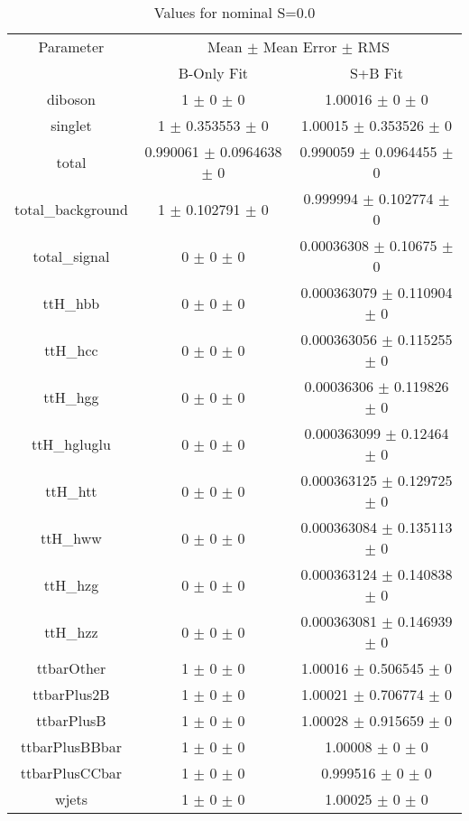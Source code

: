 \begin{table}
\centering
\caption{Values for nominal S=0.0}
\begin{tabular}{ccc}
\toprule
Parameter & \multicolumn{2}{c}{Mean $\pm$ Mean Error $\pm$ RMS}\\
 & B-Only Fit & S+B Fit\\
\midrule
diboson & \num{1} $\pm$ \num{0} $\pm$ \num{0} & \num{1.00016} $\pm$ \num{0} $\pm$ \num{0}\\
singlet & \num{1} $\pm$ \num{0.353553} $\pm$ \num{0} & \num{1.00015} $\pm$ \num{0.353526} $\pm$ \num{0}\\
total & \num{0.990061} $\pm$ \num{0.0964638} $\pm$ \num{0} & \num{0.990059} $\pm$ \num{0.0964455} $\pm$ \num{0}\\
total\_background & \num{1} $\pm$ \num{0.102791} $\pm$ \num{0} & \num{0.999994} $\pm$ \num{0.102774} $\pm$ \num{0}\\
total\_signal & \num{0} $\pm$ \num{0} $\pm$ \num{0} & \num{0.00036308} $\pm$ \num{0.10675} $\pm$ \num{0}\\
ttH\_hbb & \num{0} $\pm$ \num{0} $\pm$ \num{0} & \num{0.000363079} $\pm$ \num{0.110904} $\pm$ \num{0}\\
ttH\_hcc & \num{0} $\pm$ \num{0} $\pm$ \num{0} & \num{0.000363056} $\pm$ \num{0.115255} $\pm$ \num{0}\\
ttH\_hgg & \num{0} $\pm$ \num{0} $\pm$ \num{0} & \num{0.00036306} $\pm$ \num{0.119826} $\pm$ \num{0}\\
ttH\_hgluglu & \num{0} $\pm$ \num{0} $\pm$ \num{0} & \num{0.000363099} $\pm$ \num{0.12464} $\pm$ \num{0}\\
ttH\_htt & \num{0} $\pm$ \num{0} $\pm$ \num{0} & \num{0.000363125} $\pm$ \num{0.129725} $\pm$ \num{0}\\
ttH\_hww & \num{0} $\pm$ \num{0} $\pm$ \num{0} & \num{0.000363084} $\pm$ \num{0.135113} $\pm$ \num{0}\\
ttH\_hzg & \num{0} $\pm$ \num{0} $\pm$ \num{0} & \num{0.000363124} $\pm$ \num{0.140838} $\pm$ \num{0}\\
ttH\_hzz & \num{0} $\pm$ \num{0} $\pm$ \num{0} & \num{0.000363081} $\pm$ \num{0.146939} $\pm$ \num{0}\\
ttbarOther & \num{1} $\pm$ \num{0} $\pm$ \num{0} & \num{1.00016} $\pm$ \num{0.506545} $\pm$ \num{0}\\
ttbarPlus2B & \num{1} $\pm$ \num{0} $\pm$ \num{0} & \num{1.00021} $\pm$ \num{0.706774} $\pm$ \num{0}\\
ttbarPlusB & \num{1} $\pm$ \num{0} $\pm$ \num{0} & \num{1.00028} $\pm$ \num{0.915659} $\pm$ \num{0}\\
ttbarPlusBBbar & \num{1} $\pm$ \num{0} $\pm$ \num{0} & \num{1.00008} $\pm$ \num{0} $\pm$ \num{0}\\
ttbarPlusCCbar & \num{1} $\pm$ \num{0} $\pm$ \num{0} & \num{0.999516} $\pm$ \num{0} $\pm$ \num{0}\\
wjets & \num{1} $\pm$ \num{0} $\pm$ \num{0} & \num{1.00025} $\pm$ \num{0} $\pm$ \num{0}\\
\bottomrule
\end{tabular}
\end{table}